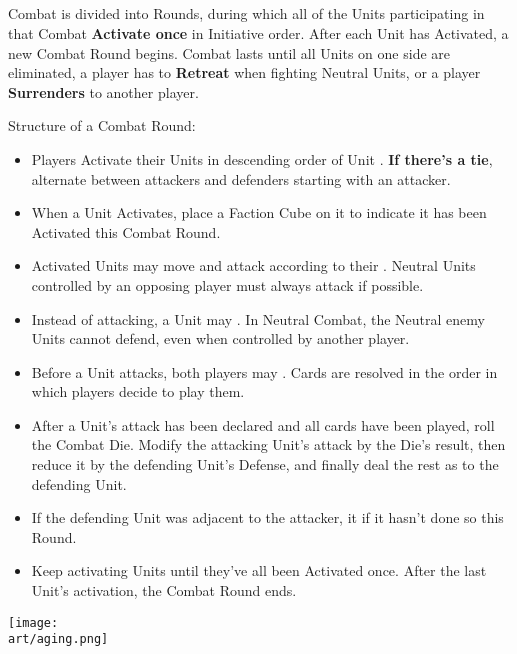 \begin{multicols}{2}
\subsection*{}
Combat is divided into Rounds, during which all of the Units participating in that Combat \textbf{Activate once} in Initiative order.
After each Unit has Activated, a new Combat Round begins.
Combat lasts until all Units on one side are eliminated, a player has to \textbf{Retreat} when fighting Neutral Units, or a player \textbf{Surrenders} to another player.

Structure of a Combat Round:
\begin{itemize}
  \item Players Activate their Units in descending order of Unit . \textbf{If there's a tie}, alternate between attackers and defenders starting with an attacker.
  \item When a Unit Activates, place a Faction Cube on it to indicate it has been Activated this Combat Round.
  \item Activated Units may move and attack according to their . Neutral Units controlled by an opposing player must always attack if possible.
  \item Instead of attacking, a Unit may .
  In Neutral Combat, the Neutral enemy Units cannot defend, even when controlled by another player.
  \item Before a Unit attacks, both players may . Cards are resolved in the order in which players decide to play them.
  \item After a Unit's attack has been declared and all cards have been played, roll the Combat Die.
    Modify the attacking Unit's attack by the Die's result, then reduce it by the defending Unit's Defense, and finally deal the rest as  to the defending Unit.
  \item If the defending Unit was adjacent to the attacker, it  if it hasn't done so this Round.
  \item Keep activating Units until they've all been Activated once.
After the last Unit's activation, the Combat Round ends.
\end{itemize}

\begin{center}
  \texttt{[image: \\art/aging.png]}
\end{center}


\end{multicols}

